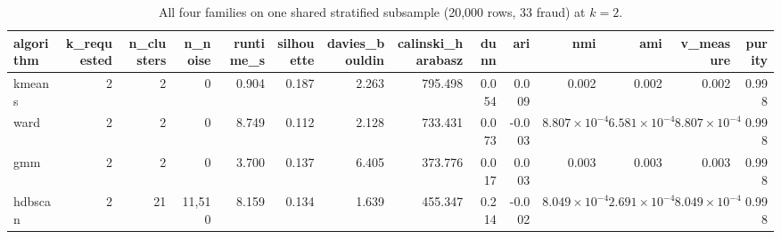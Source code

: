 \begin{table}[htbp]
\centering
\begin{tabular}{lrrrrrrrrrrrrr}
\toprule
algorithm & k\_requested & n\_clusters & n\_noise & runtime\_s & silhouette & davies\_bouldin & calinski\_harabasz & dunn & ari & nmi & ami & v\_measure & purity \\
\midrule
kmeans & 2 & 2 & 0 & 0.904 & 0.187 & 2.263 & 795.498 & 0.054 & 0.009 & 0.002 & 0.002 & 0.002 & 0.998 \\
ward & 2 & 2 & 0 & 8.749 & 0.112 & 2.128 & 733.431 & 0.073 & -0.003 & $8.807\times 10^{-4}$ & $6.581\times 10^{-4}$ & $8.807\times 10^{-4}$ & 0.998 \\
gmm & 2 & 2 & 0 & 3.700 & 0.137 & 6.405 & 373.776 & 0.017 & 0.003 & 0.003 & 0.003 & 0.003 & 0.998 \\
hdbscan & 2 & 21 & 11{,}510 & 8.159 & 0.134 & 1.639 & 455.347 & 0.214 & -0.002 & $8.049\times 10^{-4}$ & $2.691\times 10^{-4}$ & $8.049\times 10^{-4}$ & 0.998 \\
\bottomrule
\end{tabular}
\caption{All four families on one shared stratified subsample (20{,}000 rows, 33 fraud) at $k=2$.}
\label{tab:portfolio-sub}
\end{table}
